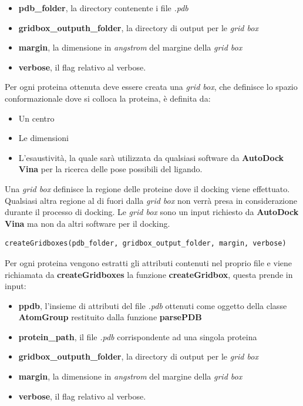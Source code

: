 \begin{itemize}
    \item \textbf{pdb\_folder}, la directory contenente i file \textit{.pdb} 
    \item \textbf{gridbox\_outputh\_folder}, la directory di output per le \textit{grid box}
    \item \textbf{margin}, la dimensione in \textit{angstrom} del margine della \textit{grid box}
    \item \textbf{verbose}, il flag relativo al verbose.
\end{itemize}

Per ogni proteina ottenuta deve essere creata una \textit{grid box}, che definisce lo spazio conformazionale dove si colloca la proteina, è definita da:

\begin{itemize}
    \item Un centro
    \item Le dimensioni
    \item L'esaustività, la quale sarà utilizzata da qualsiasi software da \textbf{AutoDock Vina} per la ricerca delle pose possibili del ligando.
\end{itemize}

Una \textit{grid box} definisce la regione delle proteine dove il docking viene effettuato. Qualsiasi altra regione al di fuori dalla \textit{grid box} non verrà presa in considerazione durante il processo di docking.\newline
Le \textit{grid box} sono un input richiesto da \textbf{AutoDock Vina} ma non da altri software per il docking.\newline

\begin{lstlisting}[language=Python, label=lst:code28, caption={createGridboxes}]
createGridboxes(pdb_folder, gridbox_output_folder, margin, verbose)
\end{lstlisting}

Per ogni proteina vengono estratti gli attributi contenuti nel proprio file e viene richiamata da \textbf{createGridboxes} la funzione \textbf{createGridbox}, questa prende in input: 

\begin{itemize}    
    \item \textbf{ppdb}, l'insieme di attributi del file \textit{.pdb} ottenuti come oggetto della classe \textbf{AtomGroup} restituito dalla funzione \textbf{parsePDB}
    \item \textbf{protein\_path}, il file \textit{.pdb} corrispondente ad una singola proteina
    \item \textbf{gridbox\_outputh\_folder}, la directory di output per le \textit{grid box}
    \item \textbf{margin}, la dimensione in \textit{angstrom} del margine della \textit{grid box}
    \item \textbf{verbose}, il flag relativo al verbose.
\end{itemize}

